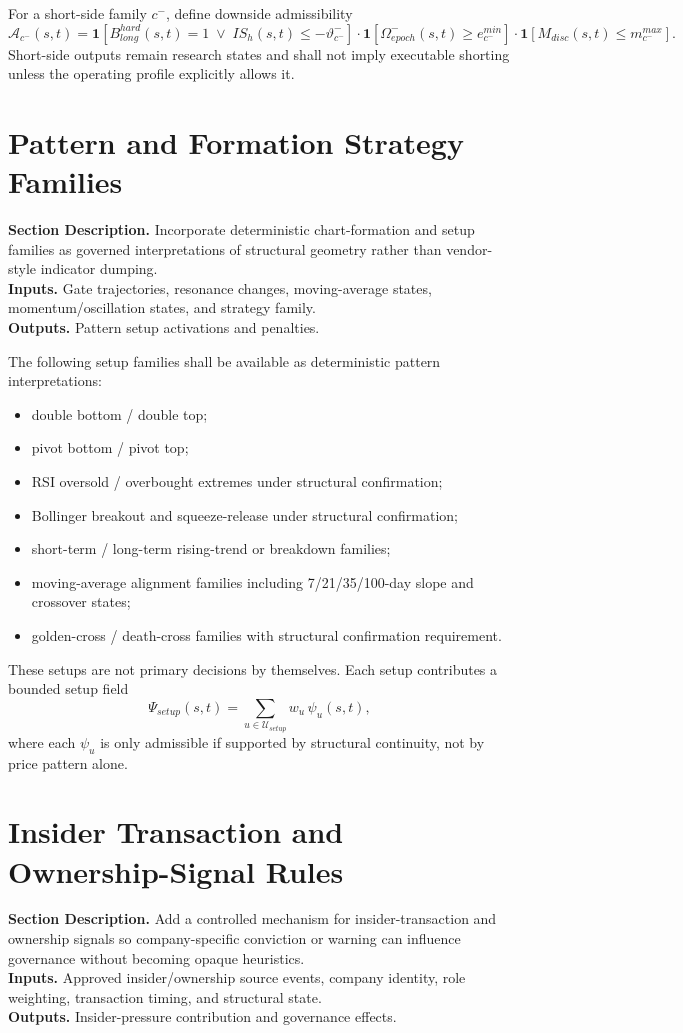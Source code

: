 \documentclass[11pt]{report}
\newcommand{\meta}[3]{\textbf{Section Description.} #1\\
\textbf{Inputs.} #2\\
\textbf{Outputs.} #3\par}
\begin{document}
For a short-side family $c^{-}$, define downside admissibility
\[
\mathcal{A}_{c^{-}}(s,t)=\mathbf{1}[B^{hard}_{long}(s,t)=1 \;\vee\; IS_h(s,t)\le -\vartheta_{c^{-}}^{-}]\cdot \mathbf{1}[\Omega_{epoch}^{-}(s,t)\ge e_{c^{-}}^{min}]\cdot \mathbf{1}[M_{disc}(s,t)\le m_{c^{-}}^{max}].
\]
Short-side outputs remain research states and shall not imply executable shorting unless the operating profile explicitly allows it.

\section{Pattern and Formation Strategy Families}
\meta{Incorporate deterministic chart-formation and setup families as governed interpretations of structural geometry rather than vendor-style indicator dumping.}{Gate trajectories, resonance changes, moving-average states, momentum/oscillation states, and strategy family.}{Pattern setup activations and penalties.}

The following setup families shall be available as deterministic pattern interpretations:
\begin{itemize}
    \item double bottom / double top;
    \item pivot bottom / pivot top;
    \item RSI oversold / overbought extremes under structural confirmation;
    \item Bollinger breakout and squeeze-release under structural confirmation;
    \item short-term / long-term rising-trend or breakdown families;
    \item moving-average alignment families including 7/21/35/100-day slope and crossover states;
    \item golden-cross / death-cross families with structural confirmation requirement.
\end{itemize}

These setups are not primary decisions by themselves. Each setup contributes a bounded setup field
\[
\Psi_{setup}(s,t)=\sum_{u\in\mathcal{U}_{setup}} w_u\,\psi_u(s,t),
\]
where each $\psi_u$ is only admissible if supported by structural continuity, not by price pattern alone.

\section{Insider Transaction and Ownership-Signal Rules}
\meta{Add a controlled mechanism for insider-transaction and ownership signals so company-specific conviction or warning can influence governance without becoming opaque heuristics.}{Approved insider/ownership source events, company identity, role weighting, transaction timing, and structural state.}{Insider-pressure contribution and governance effects.}
\end{document}
